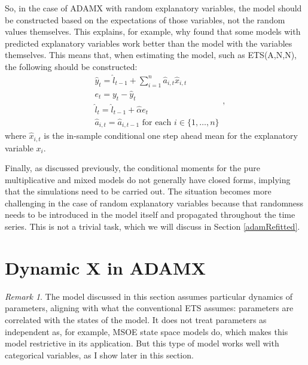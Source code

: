 \documentclass[
]{book}
\theoremstyle{definition}
\theoremstyle{definition}
\theoremstyle{definition}
\theoremstyle{definition}
\theoremstyle{remark}
\newtheorem*{remark}{Remark}
\begin{document}
So, in the case of ADAMX with random explanatory variables, the model should be constructed based on the expectations of those variables, not the random values themselves. This explains, for example, why \citet{Athanasopoulos2011} found that some models with predicted explanatory variables work better than the model with the variables themselves. This means that, when estimating the model, such as ETS(A,N,N), the following should be constructed:
\begin{equation}
  \begin{aligned}
    & \hat{y}_{t} = \hat{l}_{t-1} + \sum_{i=1}^n \hat{a}_{i,t} \hat{x}_{i,t} \\
    & e_t = y_t -\hat{y}_{t} \\
    & \hat{l}_{t} = \hat{l}_{t-1} + \hat{\alpha} e_t \\
    & \hat{a}_{i,t} = \hat{a}_{i,t-1} \text{ for each } i \in \{1, \dots, n\}
  \end{aligned},
  \label{eq:ADAMETSXANNConstructed}
\end{equation}
where \(\hat{x}_{i,t}\) is the in-sample conditional one step ahead mean for the explanatory variable \(x_i\).

Finally, as discussed previously, the conditional moments for the pure multiplicative and mixed models do not generally have closed forms, implying that the simulations need to be carried out. The situation becomes more challenging in the case of random explanatory variables because that randomness needs to be introduced in the model itself and propagated throughout the time series. This is not a trivial task, which we will discuss in Section \ref{adamRefitted}.

\hypertarget{ADAMXDynamic}{%
\section{Dynamic X in ADAMX}\label{ADAMXDynamic}}

\begin{remark}
The model discussed in this section assumes particular dynamics of parameters, aligning with what the conventional ETS assumes: parameters are correlated with the states of the model. It does not treat parameters as independent as, for example, MSOE state space models do, which makes this model restrictive in its application. But this type of model works well with categorical variables, as I show later in this section.
\end{remark}
\end{document}
